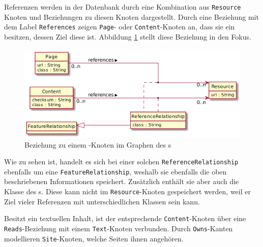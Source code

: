     Referenzen werden in der Datenbank durch eine Kombination aus
    \texttt{Resource} Knoten und Beziehungen zu diesen Knoten dargestellt.
    Durch eine Beziehung mit dem Label \texttt{References} zeigen
    \texttt{Page}- oder \texttt{Content}-Knoten an,
    dass sie ein {} besitzen, dessen Ziel diese {\resource} ist.
    Abbildung \ref{image:dbDataModelResourceRelationship} stellt diese Beziehung in den Fokus.

    \begin{figure}
        \centering
        \includegraphics[scale=\imageScalingFactor]{../resources/db-data-model/resource-relationship.png}
        \caption{Beziehung zu einem {\resource}-Knoten im Graphen des {\classificationStorage}s}
        \label{image:dbDataModelResourceRelationship}
    \end{figure}

    Wie zu sehen ist, handelt es sich bei einer solchen \texttt{ReferenceRelationship} ebenfalls
    um eine \texttt{FeatureRelationship}, weshalb sie ebenfalls die oben beschriebenen Informationen speichert.
    Zusätzlich enthält sie aber auch die Klasse des {}s.
    Diese kann nicht im \texttt{Resource}-Knoten gespeichert werden,
    weil er Ziel vieler Referenzen mit unterschiedlichen Klassen sein kann.

    Besitzt ein {\contentFeature} textuellen Inhalt,
    ist der entsprechende \texttt{Content}-Knoten über eine \texttt{Reads}-Beziehung
    mit einem \texttt{Text}-Knoten verbunden.
    Durch \texttt{Owns}-Kanten modellieren \texttt{Site}-Knoten,
    welche Seiten ihnen angehören.
